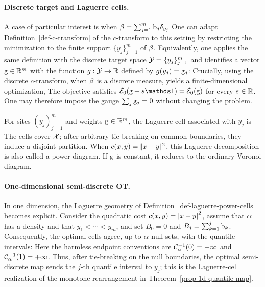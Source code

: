 \paragraph{Discrete target and Laguerre cells.}
A case of particular interest is when
\(
\beta = \sum_{j=1}^m \mathrm{b}_j \delta_{y_j}
\)
One can adapt Definition~\ref{def-c-transform} of the $\bar c$-transform to this setting by restricting the minimization to the finite support $\{y_j\}_{j=1}^m$ of $\beta$. Equivalently, one applies the same definition with the discrete target space $\mathcal{Y}=\{y_j\}_{j=1}^m$ and identifies a vector $\mathrm{g}\in\mathbb{R}^m$ with the function $g:\mathcal{Y}\to\mathbb{R}$ defined by $g(y_j)=\mathrm{g}_j$:
Crucially, using the discrete $\bar c$-transform, when $\beta$ is a discrete measure, yields a finite-dimensional optimization,
The objective satisfies $\Ee_0(\gD+s\ones)=\Ee_0(\gD)$ for every $s\in\mathbb{R}$. One may therefore impose the gauge $\sum_j\mathrm{g}_j=0$ without changing the problem.

\begin{defn}\label{def-laguerre-power-cells}
For sites $(y_j)_{j=1}^m$ and weights $\mathrm{g}\in\mathbb{R}^m$, the Laguerre cell associated with $y_j$ is
The cells cover $\mathcal{X}$; after arbitrary tie-breaking on common boundaries, they induce a disjoint partition. When $c(x,y)=|\!| x-y |\!|^2$, this Laguerre decomposition is also called a power diagram. If $\mathrm{g}$ is constant, it reduces to the ordinary Voronoi diagram.
\end{defn}
\paragraph{One-dimensional semi-discrete OT.}
In one dimension, the Laguerre geometry of Definition~\ref{def-laguerre-power-cells} becomes explicit. Consider the quadratic cost $c(x,y)=\left\lvert x-y\right\rvert^2$, assume that $\alpha$ has a density and that $y_1<\cdots<y_m$, and set $B_0=0$ and $B_j=\sum_{k=1}^j\mathrm{b}_k$. Consequently, the optimal cells agree, up to $\alpha$-null sets, with the quantile intervals:
\eql{\label{eq-semidiscrete-1d-laguerre-cells}
\foralls j\in\range{m},\qquad
\al\!\left(
\Laguerre_j(\gD^\star)
\mathbin{\triangle}
\left(\cumul{\al}^{-1}(B_{j-1}),\cumul{\al}^{-1}(B_j)\right]
\right)=0.
}
Here the harmless endpoint conventions are $\mathcal{C}_{\alpha}^{-1}(0)=-\infty$ and $\mathcal{C}_{\alpha}^{-1}(1)=+\infty$. Thus, after tie-breaking on the null boundaries, the optimal semi-discrete map sends the $j$-th quantile interval to $y_j$; this is the Laguerre-cell realization of the monotone rearrangement in Theorem~\ref{prop-1d-quantile-map}.

